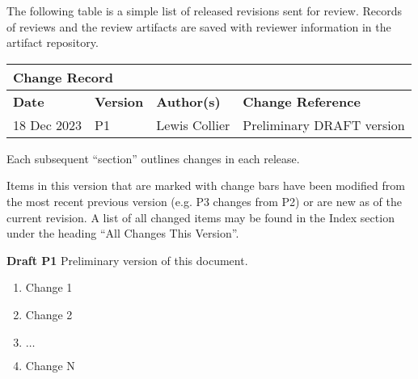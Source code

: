 
The following table is a simple list of released revisions sent for review.
Records of reviews and the review artifacts are saved with reviewer information in the \KNEADagencyName artifact repository.

\begin{table}[h]
	\centering 
		\begin{tabular}{|p{1.0in}|p{0.8in}|p{1.4in}|p{2.1in}|}
    \multicolumn{4}{l}{\bfseries Change Record} \\
		\hline
			{\bfseries Date}  &  {\bfseries Version} & {\bfseries Author(s)} & {\bfseries Change Reference} \\
		\hline
		\hline
			 18 Dec 2023	&	\centering	P1	&	{\raggedright Lewis Collier}	&	Preliminary DRAFT version  \\ \hline
		\hline		
		\hline				
  	\end{tabular}
\end{table}

Each subsequent ``section'' outlines changes in each release.

Items in this version that are marked with change bars have been modified from the most recent previous version (e.g. P3 changes from P2) or are new as of the current revision. A list of all changed items may be found in the Index section under the heading ``All Changes This Version''.

{\bf Draft P1}
Preliminary version of this document.

\begin{enumerate}[itemindent=5pt,topsep=0pt,itemsep=0pt,partopsep=0pt, parsep=0pt]
	\item Change 1            
	\item Change 2
	\item $\ldots$
	\item Change N            
\end{enumerate}
